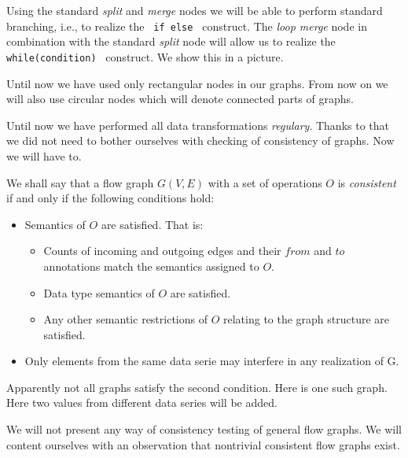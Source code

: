 Using the standard \emph{split} and \emph{merge} nodes we will be able to perform standard branching, i.e., to realize the \texttt{ if \string{\string} else \string{\string} } construct. The \emph{loop merge} node in combination with the standard \emph{split} node will allow us to realize the \texttt{ while(condition) \string{\string} } construct. We show this in a picture.

\begin{rem}
  Until now we have used only rectangular nodes in our graphs. From now on we will also use circular nodes which will denote connected parts of graphs.
\end{rem}

\label{sec:cf_constructs}

Until now we have performed all data transformations \emph{regulary}. Thanks to that we did not need to bother ourselves with checking of consistency of graphs. Now we will have to.

\begin{define}
  We shall say that a flow graph $G(V,E)$ with a set of operations $O$ is \emph{consistent} if and only if the following conditions hold:
  \begin{itemize}
    \item Semantics of $O$ are satisfied. That is:
      \begin{itemize}
        \item Counts of incoming and outgoing edges and their $from$ and $to$ annotations match the semantics assigned to $O$.
        \item Data type semantics of $O$ are satisfied.
        \item Any other semantic restrictions of $O$ relating to the graph structure are satisfied. 
      \end{itemize}
    \item Only elements from the same data serie may interfere in any realization of G.
  \end{itemize}
\end{define}


Apparently not all graphs satisfy the second condition. Here is one such graph. Here two values from different data series will be added.

\FloatBarrier


\FloatBarrier

We will not present any way of consistency testing of general flow graphs. We will content ourselves with an observation that nontrivial consistent flow graphs exist.

